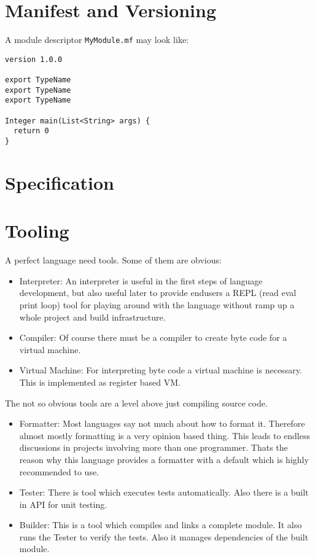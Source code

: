 \documentclass[a4paper,12pt]{report}
\begin{document}
\section{Manifest and Versioning}

A module descriptor \verb|MyModule.mf| may look like:

\begin{verbatim}
version 1.0.0

export TypeName
export TypeName
export TypeName

Integer main(List<String> args) {
  return 0
}
\end{verbatim}

\section{Specification}

\section{Tooling}

A perfect language need tools. Some of them are obvious:

\begin{itemize}
    \item Interpreter: An interpreter is useful in the first steps of language development, but also useful later to provide endusers a REPL (read eval print loop) tool for playing around with the language without ramp up a whole project and build infrastructure.
    \item Compiler: Of course there must be a compiler to create byte code for a virtual machine.
    \item Virtual Machine: For interpreting byte code a virtual machine is necessary. This is implemented as register based VM.
\end{itemize}

The not so obvious tools are a level above just compiling source code.

\begin{itemize}
    \item Formatter: Most languages say not much about how to format it. Therefore almost mostly formatting is a very opinion based thing. This leads to endless discussions in projects involving more than one programmer. Thats the reason why this language provides a formatter with a default which is highly recommended to use.
    \item Tester: There is tool which executes tests automatically. Also there is a built in API for unit testing.
    \item Builder: This is a tool which compiles and links a complete module. It also runs the Tester to verify the tests. Also it manages dependencies of the built module.
\end{itemize}
\end{document}
